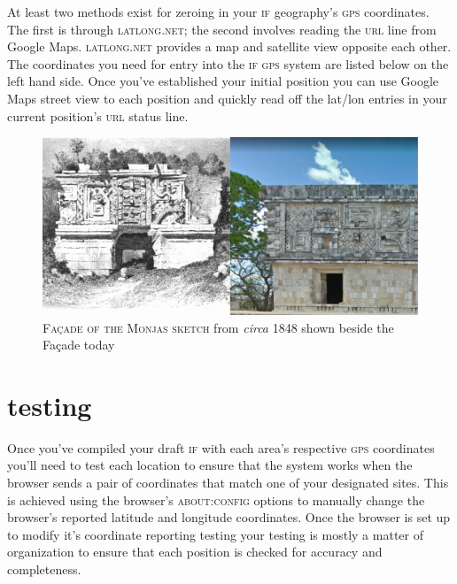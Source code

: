 \noindent At least two methods exist for zeroing in your \textsc{if} geography's
\textsc{gps} coordinates. The first is through \textsc{latlong.net}; the second
involves reading the \textsc{url} line from Google Maps. \textsc{latlong.net} provides a map and satellite view opposite each other. The coordinates you need
for entry into the \textsc{if gps} system are listed below on the left hand
side. Once you've established your initial position you can use Google Maps
street view to each position and quickly read off the lat/lon entries in your
current position's \textsc{url} status line.
\begin{figure}[h]                                                           
 \includegraphics[width=\linewidth]{./media/images/court_facade.pdf}%
  \scriptsize{\textsc{\\Façade of the Monjas sketch} from \emph{circa} 1848 shown beside the Façade today}
  \label{fig:facade}%
\end{figure}
\section{testing}
\label{sec:testing}
Once you've compiled your draft \textsc{if} with each area's respective \textsc{gps}
coordinates you'll need to test each location to ensure that the system works
when the browser sends a pair of coordinates that match one of your designated
sites. This is achieved using the browser's \textsc{about:config} options to
manually change the browser's reported latitude and longitude coordinates. Once
the browser is set up to modify it's coordinate reporting testing your testing
is mostly a matter of organization to ensure that each position is checked for
accuracy and completeness.


